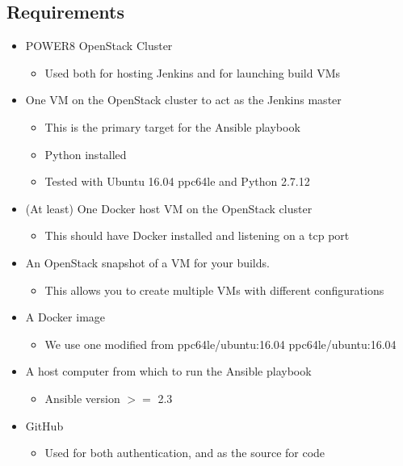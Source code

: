 \documentclass[10pt,letterpaper,onecolumn,draftclsnofoot]{IEEEtran}
\begin{document}
\subsection{Requirements}
\begin{itemize}
  \item POWER8 OpenStack Cluster
    \begin{itemize}
       \item Used both for hosting Jenkins and for launching build VMs
    \end{itemize}
      \item One VM on the OpenStack cluster to act as the Jenkins master

    \begin{itemize}
        \item  This is the primary target for the Ansible playbook
        \item  Python installed
        \item  Tested with Ubuntu 16.04 ppc64le and Python 2.7.12
    \end{itemize}
      \item    (At least) One Docker host VM on the OpenStack cluster
    \begin{itemize}
      \item  This should have Docker installed and listening on a tcp port
    \end{itemize}
      \item    An OpenStack snapshot of a VM for your builds.
    \begin{itemize}
        \item This allows you to create multiple VMs with different configurations
    \end{itemize}
      \item    A Docker image
    \begin{itemize}
        \item We use one modified from ppc64le/ubuntu:16.04 ppc64le/ubuntu:16.04
    \end{itemize}
      \item    A host computer from which to run the Ansible playbook
    \begin{itemize}
       \item Ansible version $>=$ 2.3
    \end{itemize}
      \item    GitHub 
    \begin{itemize}
       \item Used for both authentication, and as the source for code
    \end{itemize}
\end{itemize}
\end{document}

